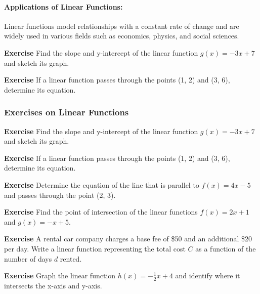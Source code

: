 \documentclass[a4paper,12pt]{book}
\newenvironment{exercise}[1][]
  {\par\medskip\noindent\textbf{Exercise #1} \rmfamily}
  {\medskip}
\begin{document}
\paragraph{Applications of Linear Functions:}
Linear functions model relationships with a constant rate of change and are widely used in various fields such as economics, physics, and social sciences.

\begin{exercise}
Find the slope and y-intercept of the linear function \( g(x) = -3x + 7 \) and sketch its graph.
\end{exercise}

\begin{exercise}
If a linear function passes through the points (1, 2) and (3, 6), determine its equation.
\end{exercise}


\subsubsection*{Exercises on Linear Functions}

\begin{exercise}
Find the slope and y-intercept of the linear function \( g(x) = -3x + 7 \) and sketch its graph.
\end{exercise}

\begin{exercise}
If a linear function passes through the points (1, 2) and (3, 6), determine its equation.
\end{exercise}

\begin{exercise}
Determine the equation of the line that is parallel to \( f(x) = 4x - 5 \) and passes through the point (2, 3).
\end{exercise}

\begin{exercise}
Find the point of intersection of the linear functions \( f(x) = 2x + 1 \) and \( g(x) = -x + 5 \).
\end{exercise}

\begin{exercise}
A rental car company charges a base fee of \$50 and an additional \$20 per day. Write a linear function representing the total cost \( C \) as a function of the number of days \( d \) rented.
\end{exercise}

\begin{exercise}
Graph the linear function \( h(x) = -\frac{1}{2}x + 4 \) and identify where it intersects the x-axis and y-axis.
\end{exercise}
\end{document}
